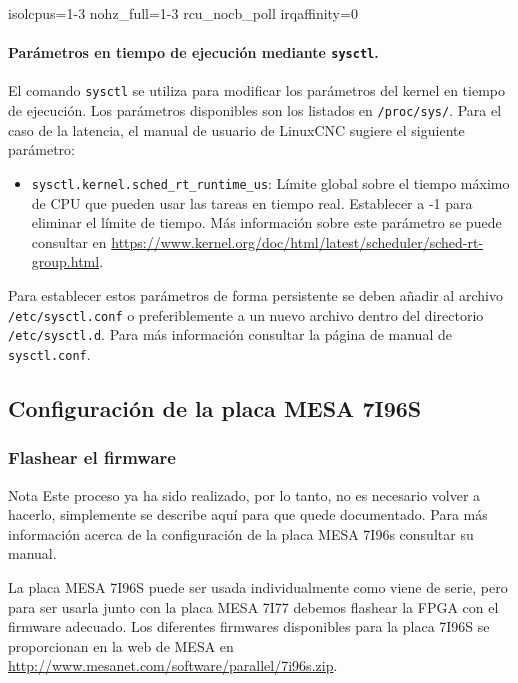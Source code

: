 \documentclass[english,spanish,a4paper,11pt]{article}
\begin{document}
\begin{listingbox}
isolcpus=1-3 nohz_full=1-3 rcu_nocb_poll irqaffinity=0
\end{listingbox}


\paragraph{Parámetros en tiempo de ejecución mediante \texttt{sysctl}.}\hfill
\medskip

El comando \texttt{sysctl} se utiliza para modificar los parámetros del kernel en tiempo de ejecución. Los parámetros disponibles son los listados en \texttt{/proc/sys/}.
%
Para el caso de la latencia, el manual de usuario de LinuxCNC \cite{linuxcncdoc} sugiere el siguiente parámetro:
\begin{itemize}
    \item \texttt{sysctl.kernel.sched\_rt\_runtime\_us}: Límite global sobre el tiempo máximo de \ac{CPU} que pueden usar las tareas en tiempo real. Establecer a -1 para eliminar el límite de tiempo. Más información sobre este parámetro se puede consultar en \url{https://www.kernel.org/doc/html/latest/scheduler/sched-rt-group.html}.
\end{itemize}

Para establecer estos parámetros de forma persistente se deben añadir al archivo \texttt{/etc/sysctl.conf} o preferiblemente a un nuevo archivo dentro del directorio \texttt{/etc/sysctl.d}. Para más información consultar la página de manual de \texttt{sysctl.conf}.


\subsection{Configuración de la placa MESA 7I96S}

\subsubsection{Flashear el firmware}

\begin{admonition}{Nota}
    Este proceso ya ha sido realizado, por lo tanto, no es necesario volver a hacerlo, simplemente se describe aquí para que quede documentado. Para más información acerca de la configuración de la placa MESA 7I96s consultar su manual.
\end{admonition}

La placa MESA 7I96S puede ser usada individualmente como viene de serie, pero para ser usarla junto con la placa MESA 7I77 debemos flashear la FPGA con el firmware adecuado. Los diferentes firmwares disponibles para la placa 7I96S se proporcionan en la web de MESA en \url{http://www.mesanet.com/software/parallel/7i96s.zip}. 
\end{document}
